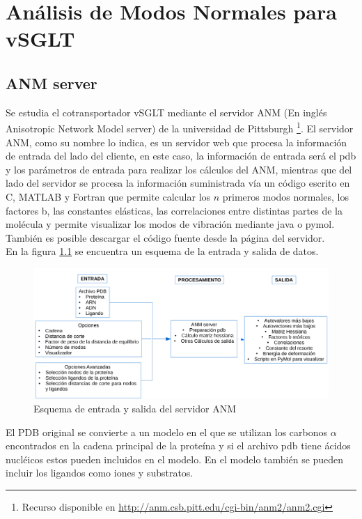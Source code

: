 \chapter{An\'{a}lisis de Modos Normales para vSGLT}\label{ch:4}

\section{ANM server}
Se estudia el cotransportador vSGLT mediante el servidor ANM (En ingl\'{e}s Anisotropic Network Model server) de la universidad de Pittsburgh \cite{Eyal2015}\footnote{Recurso disponible en \url{http://anm.csb.pitt.edu/cgi-bin/anm2/anm2.cgi}}. El servidor ANM, como su nombre lo indica, es un servidor web que procesa la informaci\'{o}n de entrada del lado del cliente, en este caso, la informaci\'{o}n de entrada ser\'{a} el pdb y los par\'{a}metros de entrada para realizar los c\'{a}lculos del ANM, mientras que del lado del servidor se procesa la informaci\'{o}n suministrada v\'{i}a un c\'{o}digo escrito en C, MATLAB y Fortran que permite calcular los $n$ primeros modos normales, los factores b, las constantes el\'{a}sticas, las correlaciones entre distintas partes de la mol\'{e}cula y permite visualizar los modos de vibraci\'{o}n mediante java o pymol. Tambi\'{e}n es posible descargar el c\'{o}digo fuente desde la p\'{a}gina del servidor.\\

En la figura \ref{fig:flujo} se encuentra un esquema de la entrada y salida de datos.\\
\begin{figure}[h]
 \centering
    \includegraphics[scale=0.5]{./Kap4/flujo.pdf} 
\caption{Esquema de entrada y salida del servidor ANM}\label{fig:flujo}
\end{figure}
El PDB original se convierte a un modelo en el que se utilizan los carbonos $\alpha$ encontrados en la cadena principal de la prote\'{i}na y si el archivo pdb tiene \'{a}cidos nucl\'{e}icos estos pueden incluidos en el modelo. En el modelo tambi\'{e}n se pueden incluir los ligandos como iones y substratos.\\
